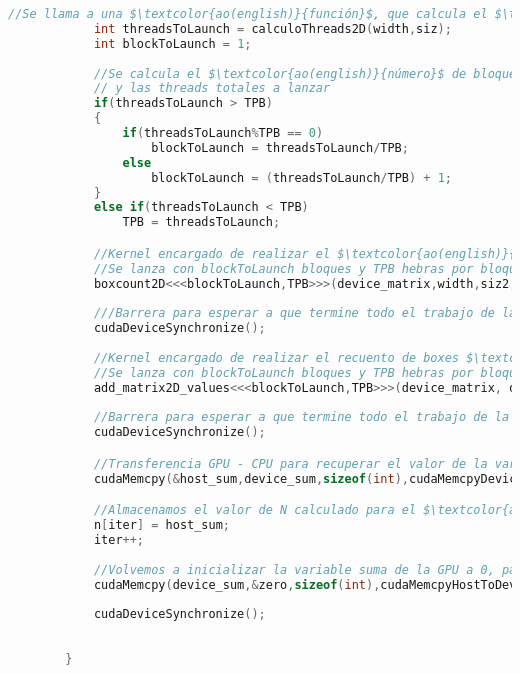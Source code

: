 \begin{lstlisting}[language=C++,caption={Primera versión del Boxcount2D paralelizado con CUDA},label=CUDABox2D,basicstyle=\tiny]
            //Se llama a una $\textcolor{ao(english)}{función}$, que calcula el $\textcolor{ao(english)}{número}$ de hebras a lanzar para cada $\textcolor{ao(english)}{tamaño}$ de siz 
            int threadsToLaunch = calculoThreads2D(width,siz);
            int blockToLaunch = 1;
    
            //Se calcula el $\textcolor{ao(english)}{número}$ de bloques a lanzar en $\textcolor{ao(english)}{función}$ de las threads por bloque 
            // y las threads totales a lanzar 
            if(threadsToLaunch > TPB)
            {
                if(threadsToLaunch%TPB == 0)
                    blockToLaunch = threadsToLaunch/TPB;
                else
                    blockToLaunch = (threadsToLaunch/TPB) + 1;
            }
            else if(threadsToLaunch < TPB)
                TPB = threadsToLaunch;

            //Kernel encargado de realizar el $\textcolor{ao(english)}{cálculo}$ de los boxes.
            //Se lanza con blockToLaunch bloques y TPB hebras por bloque 
            boxcount2D<<<blockToLaunch,TPB>>>(device_matrix,width,siz2,siz,threadsToLaunch);
    
            ///Barrera para esperar a que termine todo el trabajo de la GPU
            cudaDeviceSynchronize();
    
            //Kernel encargado de realizar el recuento de boxes $\textcolor{ao(english)}{válidos}$
            //Se lanza con blockToLaunch bloques y TPB hebras por bloque 
            add_matrix2D_values<<<blockToLaunch,TPB>>>(device_matrix, device_sum,width,siz,threadsToLaunch);
            
            //Barrera para esperar a que termine todo el trabajo de la GPU
            cudaDeviceSynchronize();

            //Transferencia GPU - CPU para recuperar el valor de la variable suma calculado
            cudaMemcpy(&host_sum,device_sum,sizeof(int),cudaMemcpyDeviceToHost);

            //Almacenamos el valor de N calculado para el $\textcolor{ao(english)}{tamañi}$ r
            n[iter] = host_sum;
            iter++;
    
            //Volvemos a inicializar la variable suma de la GPU a 0, para la siguiente $\textcolor{ao(english)}{iteración}$
            cudaMemcpy(device_sum,&zero,sizeof(int),cudaMemcpyHostToDevice);
    
            cudaDeviceSynchronize();
    
    
        }
    

\end{lstlisting}
